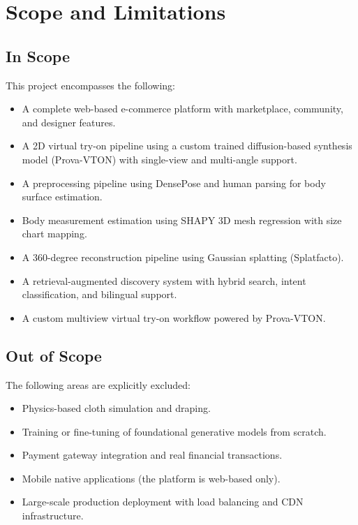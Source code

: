 \section{Scope and Limitations}

\subsection{In Scope}
This project encompasses the following:
\begin{itemize}[leftmargin=*]
    \item A complete web-based e-commerce platform with marketplace, community, and designer features.
    \item A 2D virtual try-on pipeline using a custom trained diffusion-based synthesis model (Prova-VTON) with single-view and multi-angle support.
    \item A preprocessing pipeline using DensePose and human parsing for body surface estimation.
    \item Body measurement estimation using SHAPY 3D mesh regression with size chart mapping.
    \item A 360-degree reconstruction pipeline using Gaussian splatting (Splatfacto).
    \item A retrieval-augmented discovery system with hybrid search, intent classification, and bilingual support.
    \item A custom multiview virtual try-on workflow powered by Prova-VTON.
\end{itemize}

\subsection{Out of Scope}
The following areas are explicitly excluded:
\begin{itemize}[leftmargin=*]
    \item Physics-based cloth simulation and draping.
    \item Training or fine-tuning of foundational generative models from scratch.
    \item Payment gateway integration and real financial transactions.
    \item Mobile native applications (the platform is web-based only).
    \item Large-scale production deployment with load balancing and CDN infrastructure.
\end{itemize}

